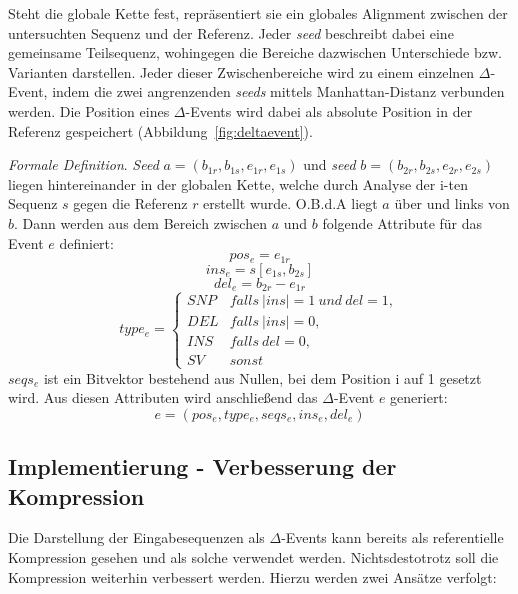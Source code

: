 \documentclass[12pt]{article}
\begin{document}
Steht die globale Kette fest, repräsentiert sie ein globales Alignment zwischen der untersuchten Sequenz und der Referenz. Jeder \textit{seed} beschreibt dabei eine gemeinsame Teilsequenz, wohingegen die Bereiche dazwischen Unterschiede bzw. Varianten darstellen. Jeder dieser Zwischenbereiche wird zu einem einzelnen $\Delta$-Event, indem die zwei angrenzenden \textit{seeds} mittels Manhattan-Distanz verbunden werden. Die Position eines $\Delta$-Events wird dabei als absolute Position in der Referenz gespeichert (Abbildung~\ref{fig:deltaevent}).

\emph{Formale Definition}. \textit{Seed} $a = (b_{1r},b_{1s},e_{1r},e_{1s})$ und \textit{seed} $b=(b_{2r},b_{2s},e_{2r},e_{2s})$ liegen hintereinander in der globalen Kette, welche durch Analyse der i-ten Sequenz $s$ gegen die Referenz $r$ erstellt wurde. O.B.d.A liegt $a$ über und links von $b$. Dann werden aus dem Bereich zwischen $a$ und $b$ folgende Attribute für das Event $e$ definiert:
\begin{equation}
pos_{e} = e_{1r}
\end{equation}
\begin{equation}
ins_{e} = s[e_{1s},b_{2s}]
\end{equation}
\begin{equation}
del_{e} = b_{2r}-e_{1r}
\end{equation}
\begin{equation}
type_{e} = 
\begin{cases}
SNP & falls~ |ins| = 1~ und~ del = 1, \\
DEL & falls~ |ins| = 0, \\
INS & falls~ del = 0, \\
SV  & sonst
\end{cases}
\end{equation}
$seqs_{e}$ ist ein Bitvektor bestehend aus Nullen, bei dem Position i auf 1 gesetzt wird. Aus diesen Attributen wird anschließend das $\Delta$-Event $e$ generiert:
\begin{equation}
e = (pos_{e}, type_{e}, seqs_{e}, ins_{e}, del_{e})
\end{equation}

\subsection{Implementierung - Verbesserung der Kompression}
\label{sec:evepro}
Die Darstellung der Eingabesequenzen als $\Delta$-Events kann bereits als referentielle Kompression gesehen und als solche verwendet werden. Nichtsdestotrotz soll die Kompression weiterhin verbessert werden. Hierzu werden zwei Ansätze verfolgt: 
\end{document}
